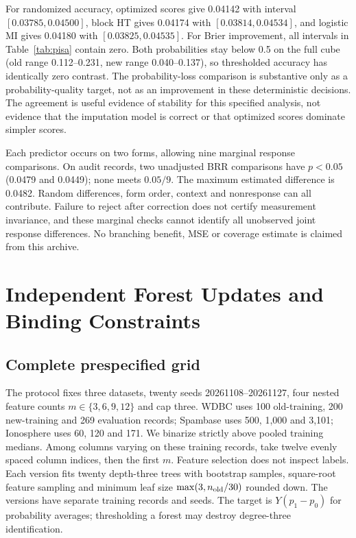For randomized accuracy, optimized scores give 0.04142 with interval
$[0.03785,0.04500]$, block HT gives 0.04174 with
$[0.03814,0.04534]$, and logistic MI gives 0.04180 with
$[0.03825,0.04535]$. For Brier improvement, all intervals in
Table~\ref{tab:pisa} contain zero. Both probabilities stay below 0.5 on
the full cube (old range 0.112--0.231, new range 0.040--0.137), so
thresholded accuracy has identically zero contrast. The probability-loss
comparison is substantive only as a probability-quality target, not as
an improvement in these deterministic decisions. The agreement is useful evidence of
stability for this specified analysis, not evidence that the imputation
model is correct or that optimized scores dominate simpler scores.

Each predictor occurs on two forms, allowing nine marginal response
comparisons. On audit records, two unadjusted BRR comparisons have
$p<0.05$ (0.0479 and 0.0449); none meets $0.05/9$. The maximum estimated
difference is 0.0482. Random differences, form order, context and
nonresponse can all contribute. Failure to reject after correction does
not certify measurement invariance, and these marginal checks cannot
identify all unobserved joint response differences. No branching benefit,
MSE or coverage estimate is claimed from this archive.

\section{Independent Forest Updates and Binding Constraints}\label{app:forest}
\subsection{Complete prespecified grid}
The protocol fixes three datasets, twenty seeds 20261108--20261127,
four nested feature counts $m\in\{3,6,9,12\}$ and cap three. WDBC uses
100 old-training, 200 new-training and 269 evaluation records; Spambase
uses 500, 1,000 and 3,101; Ionosphere uses 60, 120 and 171. We binarize
strictly above pooled training medians. Among columns varying on these
training records, take twelve evenly spaced column indices, then the
first $m$. Feature selection does not inspect labels. Each version fits
twenty depth-three trees with bootstrap samples, square-root feature
sampling and minimum leaf size $\max(3,n_{\rm old}/30)$ rounded down.
The versions have separate training records and seeds. The target is
$Y(p_1-p_0)$ for probability averages; thresholding a forest may destroy
degree-three identification.

